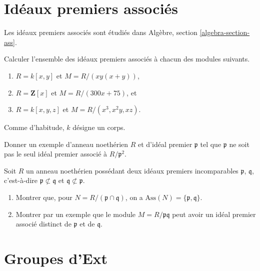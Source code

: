 \section{Idéaux premiers associés}
\label{section-ass}

\noindent
Les idéaux premiers associés sont étudiés dans
Algèbre, section \ref{algebra-section-ass}.

\begin{exercise}
\label{exercise-compute-ass}
Calculer l'ensemble des idéaux premiers associés à chacun des modules suivants.
\begin{enumerate}
\item $R = k[x, y]$ et $M = R/(xy(x + y))$,
\item $R = \mathbf{Z}[x]$ et $M = R/(300x + 75)$, et
\item $R = k[x, y, z]$ et $M = R/(x^3, x^2y, xz)$.
\end{enumerate}
Comme d'habitude, $k$ désigne un corps.
\end{exercise}

\begin{exercise}
\label{exercise-prime-power-not-primary}
Donner un exemple d'anneau noethérien $R$ et d'idéal premier $\mathfrak p$
tel que $\mathfrak p$ ne soit pas le seul idéal premier associé à $R/\mathfrak p^2$.
\end{exercise}

\begin{exercise}
\label{exercise-product-primes-not-only-associated}
Soit $R$ un anneau noethérien possédant deux idéaux premiers incomparables
$\mathfrak p$, $\mathfrak q$, c'est-à-dire $\mathfrak p \not \subset \mathfrak q$
et $\mathfrak q \not \subset \mathfrak p$.
\begin{enumerate}
\item Montrer que, pour $N = R/(\mathfrak p \cap \mathfrak q)$,
on a $\text{Ass}(N) = \{\mathfrak p, \mathfrak q\}$.
\item Montrer par un exemple que le module
$M = R/\mathfrak p \mathfrak q$ peut
avoir un idéal premier associé distinct de $\mathfrak p$ et de $\mathfrak q$.
\end{enumerate}
\end{exercise}





\section{Groupes d'Ext}
\label{section-ext}

